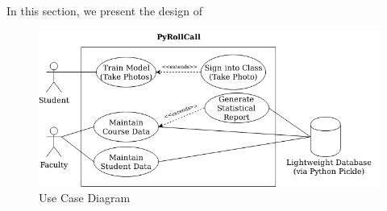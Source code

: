 In this section, we present the design of 

\begin{figure}[!htb]
  \centering
  \includegraphics[width=\linewidth]{figures/use-case.png}
  \caption{Use Case Diagram}
  \label{fig:implementation}
\end{figure}
